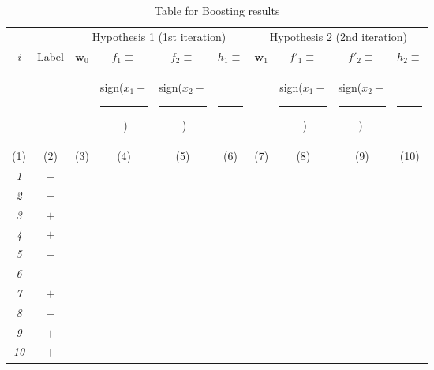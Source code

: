 \documentclass[11pt]{article}
\begin{document}
\begin{table}[h]
      {\centering
        \begin{tabular}{|c|c||c|c|c|c||c|c|c|c|}

          \hline
          & & \multicolumn{4}{c||}{Hypothesis 1 (1st iteration)}
	  & \multicolumn{4}{c|}{Hypothesis 2 (2nd iteration)} \\
          \cline{3-10}
          {\em i} & Label & $\textbf{w}_0$ & $f_1 \equiv $ & $f_2 \equiv $ & $h_1\equiv$ & $\textbf{w}_1$ &  $f'_1 \equiv $ & $f'_2 \equiv $ & $h_2 \equiv $ \\
          & & & sign($x_1 -$\rule[-2pt]{3mm}{0.2pt}$\;$) & sign($x_2 -$\rule[-2pt]{3mm}{0.2pt}$\;$) & $\;$\rule[-2pt]{1cm}{0.2pt}$\;$ & & sign($x_1 -$\rule[-2pt]{3mm}{0.2pt}$\;$) & sign($x_2 -$\rule[-2pt]{3mm}{0.2pt}$)\;$ & $\;$\rule[-2pt]{1cm}{0.2pt}$\;$ \\

          \tiny{(1)} & \tiny{(2)} & \tiny{(3)} & \tiny{(4)} &  \tiny{(5)} & \tiny{(6)} & \tiny{(7)} & \tiny{(8)} & \tiny{(9)} & \tiny{(10)}\\
          \hline \hline
          {\em 1} & $-$ & & & & & & & &  \\
          \hline
          {\em 2} & $-$ & & & & & & & &  \\
          \hline
          {\em 3} & $+$ & & & & & & & & \\
          \hline
          {\em 4} & $+$ & & & & & & & & \\
          \hline
          {\em 5} & $-$ & & & & & & & & \\
          \hline
          {\em 6} & $-$ & & & & & & & & \\
          \hline
          {\em 7} & $+$ & & & & & & & & \\
          \hline
          {\em 8} & $-$ & & & & & & & & \\
          \hline
          {\em 9} & $+$ & & & & & & & & \\
          \hline
          {\em 10} & $+$ & & & & & & & & \\
          \hline
        \end{tabular}
        \caption{Table for Boosting results}\label{table:ltu}}
    \end{table}
\end{document}
